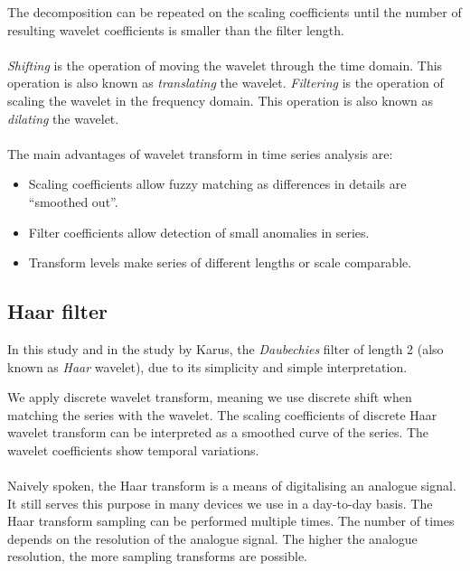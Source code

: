 The decomposition can be repeated on the scaling coefficients until the number
of resulting wavelet coefficients is smaller than the filter length.

\paragraph{}
\emph{Shifting }\rm is the operation of moving the wavelet through the time
domain. This operation is also known as \emph{translating }\rm the wavelet.
\emph{Filtering }\rm is the operation of scaling the wavelet in the frequency
domain. This operation is also known as \emph{dilating }\rm the wavelet.

\paragraph{}
The main advantages of wavelet transform in time series analysis are:
\begin{itemize}
	\item Scaling coefficients allow fuzzy matching as differences in details are
	``smoothed out''.
	\item Filter coefficients allow detection of small anomalies in series.
	\item Transform levels make series of different lengths or scale comparable.
\end{itemize}

\subsection{Haar filter}
In this study and in the study by Karus, the \emph{Daubechies }\rm filter of
length 2 (also known as \emph{Haar }\rm wavelet), due to its simplicity and
simple interpretation.

We apply discrete wavelet transform, meaning we use discrete shift when matching
the series with the wavelet. The scaling coefficients of discrete Haar wavelet
transform can be interpreted as a smoothed curve of the series. The wavelet
coefficients show temporal variations.

\paragraph{}
Naively spoken, the Haar transform is a means of digitalising an analogue
signal. It still serves this purpose in many devices we use in a day-to-day
basis. The Haar transform sampling can be performed multiple times. The number
of times depends on the resolution of the analogue signal. The higher the
analogue resolution, the more sampling transforms are possible.\\

